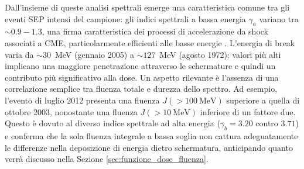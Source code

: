 \documentclass[12pt]{report}
\begin{document}
\begin{table}[h]
\centering
{}
\caption{Fluenze integrali omnidirezionali per gli otto eventi SEP analizzati, ordinate per $J(>10\,\mathrm{MeV})$ decrescente. Le fluenze sono espresse in \unit{\per\cm\squared}.}
\label{tab:fluenze_integrali}
\end{table}

\noindent Dall'insieme di queste analisi spettrali emerge una caratteristica comune tra gli eventi SEP intensi del campione: gli indici spettrali a bassa energia $\gamma_a$ variano tra $\sim 0.9-1.3$, una firma caratteristica dei processi di accelerazione da shock associati a CME, particolarmente efficienti alle basse energie \cite{Desai2016spectral}. L'energia di break varia da $\sim 30$~MeV (gennaio 2005) a $\sim 127$~MeV (agosto 1972): valori più alti implicano una maggiore penetrazione attraverso le schermature e quindi un contributo più significativo alla dose. Un aspetto rilevante è l'assenza di una correlazione semplice tra fluenza totale e durezza dello spettro. Ad esempio, l'evento di luglio 2012 presenta una fluenza $J(>100~\text{MeV})$ superiore a quella di ottobre 2003, nonostante una fluenza $J(>10~\text{MeV})$ inferiore di un fattore due. Questo è dovuto al diverso indice spettrale ad alta energia ($\gamma_b = 3.20$ contro $3.71$) e conferma che la sola fluenza integrale a bassa soglia non cattura adeguatamente le differenze nella deposizione di energia dietro schermatura, anticipando quanto verrà discusso nella Sezione \ref{sec:funzione_dose_fluenza}.
\end{document}
